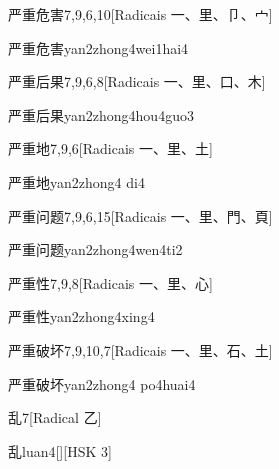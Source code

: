 \begin{entry}{严重危害}{7,9,6,10}[Radicais ⼀、⾥、⼙、⼧]
  \begin{phonetics}{严重危害}{yan2zhong4wei1hai4}
  \end{phonetics}
\end{entry}

\begin{entry}{严重后果}{7,9,6,8}[Radicais ⼀、⾥、⼝、⽊]
  \begin{phonetics}{严重后果}{yan2zhong4hou4guo3}
  \end{phonetics}
\end{entry}

\begin{entry}{严重地}{7,9,6}[Radicais ⼀、⾥、⼟]
  \begin{phonetics}{严重地}{yan2zhong4 di4}
  \end{phonetics}
\end{entry}

\begin{entry}{严重问题}{7,9,6,15}[Radicais ⼀、⾥、⾨、⾴]
  \begin{phonetics}{严重问题}{yan2zhong4wen4ti2}
  \end{phonetics}
\end{entry}

\begin{entry}{严重性}{7,9,8}[Radicais ⼀、⾥、⼼]
  \begin{phonetics}{严重性}{yan2zhong4xing4}
  \end{phonetics}
\end{entry}

\begin{entry}{严重破坏}{7,9,10,7}[Radicais ⼀、⾥、⽯、⼟]
  \begin{phonetics}{严重破坏}{yan2zhong4 po4huai4}
  \end{phonetics}
\end{entry}

\begin{entry}{乱}{7}[Radical ⼄]
  \begin{phonetics}{乱}{luan4}[][HSK 3]
  \end{phonetics}
\end{entry}

